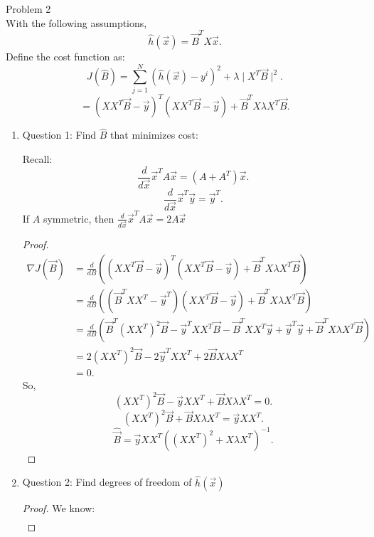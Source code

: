 \documentclass[a4paper]{article}
\begin{document}
\begin{note}{Problem 2} \\
  With the following assumptions,
  \[
    \hat{h}(\vec{x}) = \vec{B}^T X \vec{x} 
  .\] 
  Define the cost function as:
  \[
    J(\hat{B}) = \sum_{j=1}^N \left( \hat{h}(\vec{x}) - y^i \right)^2 + \lambda \mid X^T \vec{B}\mid^2  
  .\] 
  \[
    = (XX^T \vec{B} - \vec{y})^T (XX^T \vec{B} - \vec{y}) + \vec{B}^T X \lambda X^T \vec{B}
  .\] 
  \begin{enumerate}
    \item Question 1: Find $\hat{B}$ that minimizes cost:
      \begin{note}
        Recall:
        \[
          \frac{d}{d\vec{x}} \vec{x}^T A \vec{x} = (A+A^T) \vec{x} 
        .\]
        \[
          \frac{d}{d \vec{x}} \vec{x}^T \vec{y} = \vec{y}^T
        .\] 
        If $A$ symmetric, then $\frac{d}{d \vec{x}} \vec{x}^T A \vec{x} = 2A \vec{x}$
      \end{note}
      \begin{proof}
        \begin{align*}
          \nabla J\left( \vec{B} \right) &=  \frac{d}{dB}  \left( (XX^T \vec{B} - \vec{y})^T (XX^T \vec{B} - \vec{y}) + \vec{B}^T X \lambda X^T \vec{B} \right)  \\
                                         &= \frac{d}{dB} \left( \left( \vec{B}^T XX^T - \vec{y}^T \right)  (XX^T \vec{B} - \vec{y}) +  \vec{B}^T X \lambda X^T \vec{B}   \right) \\   
                                         &= \frac{d}{dB} \left( \vec{B}^T (XX^T)^2\vec{B} - \vec{y}^TXX^T \vec{B} - \vec{B}^T XX^T \vec{y} + \vec{y}^T \vec{y} +  \vec{B}^T X \lambda X^T \vec{B} \right)  \\
                                         &= 2 (XX^T)^2 \vec{B} - 2\vec{y}^T XX^T + 2 \vec{B} X\lambda X^T \\
                                         &= 0
        .\end{align*}
        So,
        \[
          (XX^T)^2 \vec{B} - \vec{y} XX^T + \vec{B}X \lambda X^T = 0 
        .\]
        \[
          (XX^T)^2 \vec{B} + \vec{B}X \lambda X^T = \vec{y} XX^T  
        .\] 
        \[
          \hat{\vec{B}} = \vec{y} XX^T ((XX^T)^2 +  X \lambda X^T)^{-1}
        .\] 
      \end{proof}
    \item Question 2: Find degrees of freedom of $\hat{h}(\vec{x})$
      \begin{proof}
        We know:
        \begin{align*}

\end{align*}
\end{proof}
\end{enumerate}
\end{note}
\end{document}
